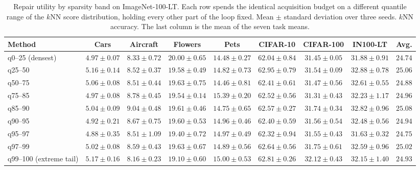 \begin{table}[t]
\centering
\small
\setlength{\tabcolsep}{4pt}
\caption{Repair utility by sparsity band on ImageNet-100-LT. Each row spends the identical acquisition budget on a different quantile range of the $k$NN score distribution, holding every other part of the loop fixed. Mean $\pm$ standard deviation over three seeds. $k$NN accuracy. The last column is the mean of the seven task means.}
\label{tab:percentile-utility-full-knn}
\begin{adjustbox}{max width=\textwidth}
\begin{tabular}{lcccccccc}
\toprule
Method & Cars & Aircraft & Flowers & Pets & CIFAR-10 & CIFAR-100 & IN100-LT & Avg. \\
\midrule
q0--25 (densest) & $4.97\pm0.07$ & $8.33\pm0.72$ & $20.00\pm0.65$ & $14.48\pm0.27$ & $62.04\pm0.84$ & $31.45\pm0.05$ & $31.88\pm0.91$ & $24.74$ \\
q25--50 & $5.16\pm0.14$ & $8.52\pm0.37$ & $19.58\pm0.49$ & $14.82\pm0.73$ & $62.95\pm0.79$ & $31.54\pm0.09$ & $32.88\pm0.78$ & $25.06$ \\
q50--75 & $5.06\pm0.08$ & $8.51\pm0.44$ & $19.63\pm0.75$ & $14.46\pm0.81$ & $62.41\pm0.61$ & $31.47\pm0.56$ & $32.61\pm0.55$ & $24.88$ \\
q75--85 & $4.97\pm0.08$ & $8.78\pm0.45$ & $19.54\pm0.14$ & $15.39\pm0.20$ & $62.52\pm0.56$ & $31.31\pm0.43$ & $32.23\pm1.17$ & $24.96$ \\
q85--90 & $5.04\pm0.09$ & $9.04\pm0.48$ & $19.61\pm0.46$ & $14.75\pm0.65$ & $62.57\pm0.27$ & $31.74\pm0.34$ & $32.82\pm0.96$ & $25.08$ \\
q90--95 & $4.92\pm0.21$ & $8.67\pm0.75$ & $19.60\pm0.53$ & $14.96\pm0.46$ & $62.40\pm0.59$ & $31.56\pm0.54$ & $32.48\pm0.56$ & $24.94$ \\
q95--97 & $4.88\pm0.35$ & $8.51\pm1.09$ & $19.40\pm0.72$ & $14.97\pm0.49$ & $62.32\pm0.94$ & $31.55\pm0.43$ & $31.63\pm0.32$ & $24.75$ \\
q97--99 & $5.02\pm0.08$ & $8.59\pm0.43$ & $19.63\pm0.67$ & $14.89\pm0.56$ & $62.64\pm0.56$ & $31.75\pm0.61$ & $32.59\pm0.96$ & $25.02$ \\
q99--100 (extreme tail) & $5.17\pm0.16$ & $8.16\pm0.23$ & $19.10\pm0.60$ & $15.00\pm0.53$ & $62.81\pm0.26$ & $32.12\pm0.43$ & $32.15\pm1.40$ & $24.93$ \\
\bottomrule
\end{tabular}
\end{adjustbox}
\end{table}
